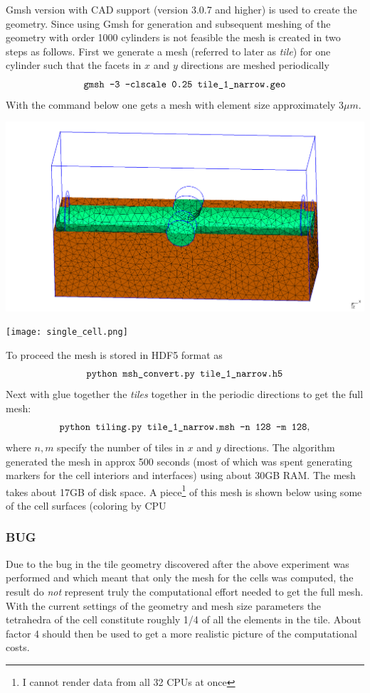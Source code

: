 \documentclass[11pt,a4paper]{article}
\begin{document}
Gmsh version with CAD support (version 3.0.7 and higher) is used to create
the geometry. Since using Gmsh for generation and subsequent meshing of the 
geometry with order 1000 cylinders is not feasible the mesh is created in two 
steps as follows. First we generate a mesh (referred to later as \emph{tile}) 
for one cylinder such that the facets in $x$ and $y$ directions are meshed periodically
\[
\texttt{gmsh -3 -clscale 0.25 tile\textunderscore 1\textunderscore narrow.geo}
\]
With the command below one gets a mesh with element size approximately 3$\mu m$.
\begin{center}
\includegraphics[width=\textwidth]{tile_1.png}
\end{center}

\begin{center}
\texttt{[image: single\_cell.png]}
\end{center}

To proceed the mesh is stored in HDF5 format as
\[
\texttt{python msh\textunderscore convert.py tile\textunderscore 1\textunderscore narrow.h5}
\]
Next with glue together the \emph{tiles} together in the periodic directions to 
get the full mesh:
\[
\texttt{python tiling.py tile\textunderscore 1\textunderscore narrow.msh -n 128 -m 128},
\]
where $n, m$ specify the number of tiles in $x$ and $y$ directions. The algorithm generated the
mesh in approx 500 seconds (most of which was spent generating markers for the cell interiors
and interfaces) using about 30GB RAM. The mesh takes about 17GB of disk space.
A piece\footnote{I cannot render data from all 32 CPUs at once} of this mesh is shown below 
using some of the cell surfaces (coloring by CPU

\subsubsection*{BUG} Due to the bug in the tile geometry discovered after the
above experiment was performed and which meant that only the mesh for the cells
was computed, the result do \emph{not} represent truly the computational effort
needed to get the full mesh. With the current settings of the geometry and mesh size
parameters the tetrahedra of the cell constitute roughly 1/4 of all the elements
in the tile. About factor 4 should then be used to get a more realistic picture
of the computational costs.
\end{document}
